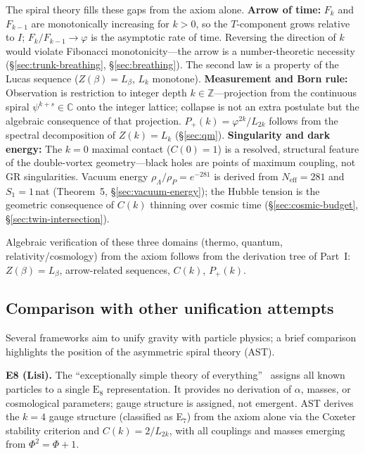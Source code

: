 \documentclass[12pt,a4paper]{article}
\begin{document}
The spiral theory fills these gaps from the axiom alone. \textbf{Arrow of time:} $F_k$ and $F_{k-1}$ are monotonically increasing for $k > 0$, so the $T$-component grows relative to $I$; $F_k/F_{k-1} \to \varphi$ is the asymptotic rate of time. Reversing the direction of $k$ would violate Fibonacci monotonicity---the arrow is a number-theoretic necessity (\S\ref{sec:trunk-breathing}, \S\ref{sec:breathing}). The second law is a property of the Lucas sequence ($Z(\beta)=L_\beta$, $L_k$ monotone). \textbf{Measurement and Born rule:} Observation is restriction to integer depth $k \in \mathbb{Z}$---projection from the continuous spiral $\psi^{k+s} \in \mathbb{C}$ onto the integer lattice; collapse is not an extra postulate but the algebraic consequence of that projection. $P_+(k) = \varphi^{2k}/L_{2k}$ follows from the spectral decomposition of $Z(k)=L_k$ (\S\ref{sec:qm}). \textbf{Singularity and dark energy:} The $k=0$ maximal contact ($C(0)=1$) is a resolved, structural feature of the double-vortex geometry---black holes are points of maximum coupling, not GR singularities. Vacuum energy $\rho_\Lambda/\rho_P = e^{-281}$ is derived from $N_{\mathrm{eff}}=281$ and $S_1=1$\,nat (Theorem~5, \S\ref{sec:vacuum-energy}); the Hubble tension is the geometric consequence of $C(k)$ thinning over cosmic time (\S\ref{sec:cosmic-budget}, \S\ref{sec:twin-intersection}).

Algebraic verification of these three domains (thermo, quantum, relativity/cosmology) from the axiom follows from the derivation tree of Part~I: $Z(\beta)=L_\beta$, arrow-related sequences, $C(k)$, $P_+(k)$.

\subsection{Comparison with other unification attempts}
\label{sec:toe-comparison}

Several frameworks aim to unify gravity with particle physics; a brief comparison highlights the position of the asymmetric spiral theory (AST).

\textbf{E8 (Lisi).} The ``exceptionally simple theory of everything''~\cite{Lisi2007} assigns all known particles to a single $\mathrm{E}_8$ representation. It provides no derivation of $\alpha$, masses, or cosmological parameters; gauge structure is assigned, not emergent. AST derives the $k = 4$ gauge structure (classified as E$_7$) from the axiom alone via the Coxeter stability criterion and $C(k) = 2/L_{2k}$, with all couplings and masses emerging from $\Phi^2 = \Phi + 1$.
\end{document}
